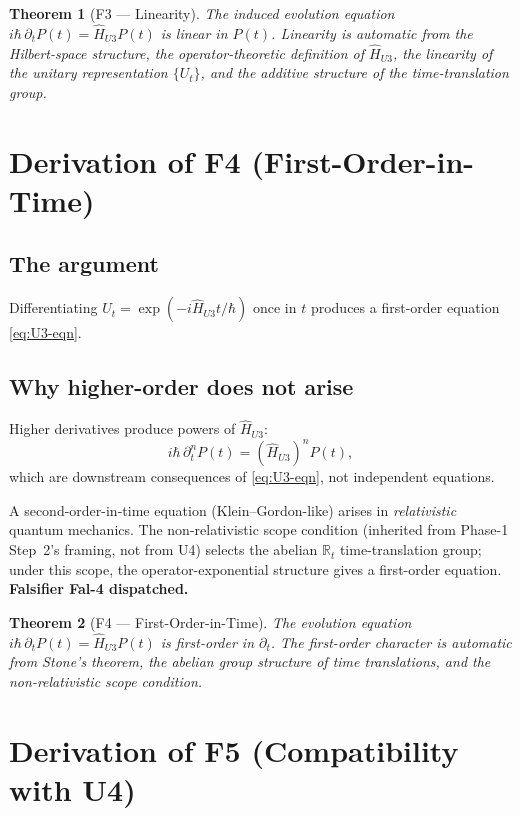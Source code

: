 \documentclass[11pt,a4paper]{article}
\newtheorem{theorem}{Theorem}[section]
\begin{document}
\begin{theorem}[F3 --- Linearity]
The induced evolution equation $i\hbar \, \partial_t P(t) = \hat{H}_{U3} P(t)$ is linear in $P(t)$. Linearity is automatic from the Hilbert-space structure, the operator-theoretic definition of $\hat{H}_{U3}$, the linearity of the unitary representation $\{U_t\}$, and the additive structure of the time-translation group.
\end{theorem}

\section{Derivation of F4 (First-Order-in-Time)}\label{sec:F4}

\subsection{The argument}

Differentiating $U_t = \exp(-i\hat{H}_{U3} t/\hbar)$ once in $t$ produces a first-order equation \eqref{eq:U3-eqn}.

\subsection{Why higher-order does not arise}

Higher derivatives produce powers of $\hat{H}_{U3}$:
\[
i\hbar \, \partial_t^n P(t) = (\hat{H}_{U3})^n P(t),
\]
which are downstream consequences of \eqref{eq:U3-eqn}, not independent equations.

A second-order-in-time equation (Klein--Gordon-like) arises in \emph{relativistic} quantum mechanics. The non-relativistic scope condition (inherited from Phase-1 Step~2's framing, not from U4) selects the abelian $\mathbb{R}_t$ time-translation group; under this scope, the operator-exponential structure gives a first-order equation. \textbf{Falsifier Fal-4 dispatched.}

\begin{theorem}[F4 --- First-Order-in-Time]
The evolution equation $i\hbar \, \partial_t P(t) = \hat{H}_{U3} P(t)$ is first-order in $\partial_t$. The first-order character is automatic from Stone's theorem, the abelian group structure of time translations, and the non-relativistic scope condition.
\end{theorem}

\section{Derivation of F5 (Compatibility with U4)}\label{sec:F5}
\end{document}

